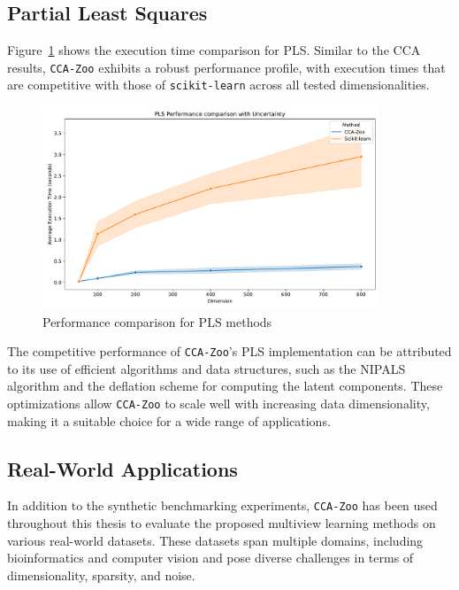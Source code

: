 \subsection{Partial Least Squares}

Figure~\ref{fig:pls_benchmark} shows the execution time comparison for PLS. Similar to the CCA results, \texttt{CCA-Zoo} exhibits a robust performance profile, with execution times that are competitive with those of \texttt{scikit-learn} across all tested dimensionalities.

\begin{figure}[h]
\centering
\includegraphics[width=0.9\textwidth]{figures/PLS_Speed_Benchmark}
\caption{Performance comparison for PLS methods}
\label{fig:pls_benchmark}
\end{figure}

The competitive performance of \texttt{CCA-Zoo}'s PLS implementation can be attributed to its use of efficient algorithms and data structures, such as the NIPALS algorithm and the deflation scheme for computing the latent components. These optimizations allow \texttt{CCA-Zoo} to scale well with increasing data dimensionality, making it a suitable choice for a wide range of applications.

\subsection{Real-World Applications}

In addition to the synthetic benchmarking experiments, \texttt{CCA-Zoo} has been used throughout this thesis to evaluate the proposed multiview learning methods on various real-world datasets. These datasets span multiple domains, including bioinformatics and computer vision and pose diverse challenges in terms of dimensionality, sparsity, and noise.

